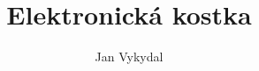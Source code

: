 \documentclass[11pt,a4paper]{article}
\author{Jan Vykydal}
\title{Elektronická kostka}
\begin{document}
	
		
	
	
	
	
	\label{konec}
\end{document}
